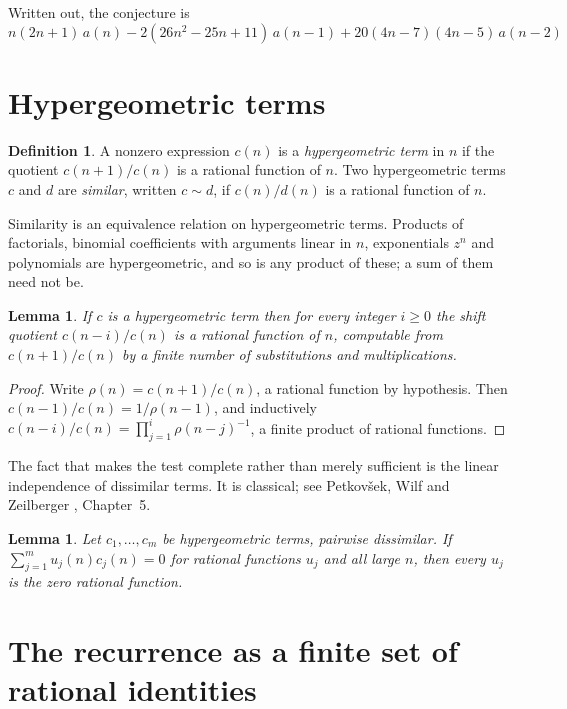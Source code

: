\documentclass[11pt,a4paper]{article}
\theoremstyle{plain}
\newtheorem{lemma}[theorem]{Lemma}
\theoremstyle{definition}
\newtheorem{definition}[theorem]{Definition}
\begin{document}
Written out, the conjecture is
\begin{equation}\label{eq:conj}
n \left(2 n + 1\right)\,a(n) -  2 \left(26 n^{2} - 25 n + 11\right)\,a(n-1) + 20 \left(4 n - 7\right) \left(4 n - 5\right)\,a(n-2)
\end{equation}

\section{Hypergeometric terms}

\begin{definition}
A nonzero expression $c(n)$ is a \emph{hypergeometric term} in $n$ if the quotient
$c(n+1)/c(n)$ is a rational function of $n$. Two hypergeometric terms $c$ and $d$ are
\emph{similar}, written $c\sim d$, if $c(n)/d(n)$ is a rational function of $n$.
\end{definition}

Similarity is an equivalence relation on hypergeometric terms. Products of factorials,
binomial coefficients with arguments linear in $n$, exponentials $z^{n}$ and polynomials
are hypergeometric, and so is any product of these; a sum of them need not be.

\begin{lemma}\label{lem:shift}
If $c$ is a hypergeometric term then for every integer $i\ge 0$ the shift quotient
$c(n-i)/c(n)$ is a rational function of $n$, computable from $c(n+1)/c(n)$ by a finite
number of substitutions and multiplications.
\end{lemma}

\begin{proof}
Write $\rho(n)=c(n+1)/c(n)$, a rational function by hypothesis. Then
$c(n-1)/c(n)=1/\rho(n-1)$, and inductively
$c(n-i)/c(n)=\prod_{j=1}^{i}\rho(n-j)^{-1}$, a finite product of rational functions.
\end{proof}

The fact that makes the test complete rather than merely sufficient is the linear
independence of dissimilar terms. It is classical; see Petkov\v{s}ek, Wilf and Zeilberger
\cite{AB}, Chapter~5.

\begin{lemma}\label{lem:indep}
Let $c_{1},\dots,c_{m}$ be hypergeometric terms, pairwise dissimilar. If
$\sum_{j=1}^{m}u_{j}(n)c_{j}(n)=0$ for rational functions $u_{j}$ and all large $n$, then
every $u_{j}$ is the zero rational function.
\end{lemma}

\section{The recurrence as a finite set of rational identities}
\end{document}
